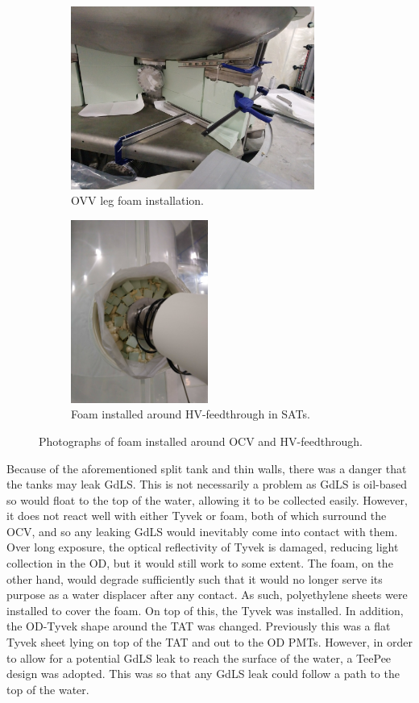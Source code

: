 \begin{figure}[!tbph]
\begin{subfigure}{.5\textwidth}
  \centering
  \includegraphics[height=6cm, width=\linewidth]{Figures/Construction/BAT_green_foam.JPG}
  \caption{OVV leg foam installation.}
  \label{fig:ocv_leg_foam}
  \end{subfigure}
  \begin{subfigure}{.5\textwidth}
  \centering
  \includegraphics[height=6cm, width=\linewidth]{Figures/Construction/HV_foam.jpg}
  \caption{Foam installed around HV-feedthrough in SATs.}
  \label{fig:hv_port_foam}
  \end{subfigure}
\caption{Photographs of foam installed around OCV and HV-feedthrough.}
\label{fig:Additional_foam_installation}
\end{figure}

\par
Because of the aforementioned split tank and thin walls, there was a danger that the tanks may leak GdLS.
This is not necessarily a problem as GdLS is oil-based so would float to the top of the water, allowing it to be collected easily.
However, it does not react well with either Tyvek or foam, both of which surround the OCV, and so any leaking GdLS would inevitably come into contact with them.
Over long exposure, the optical reflectivity of Tyvek is damaged, reducing light collection in the OD, but it would still work to some extent.
The foam, on the other hand, would degrade sufficiently such that it would no longer serve its purpose as a water displacer after any contact.
As such, polyethylene sheets were installed to cover the foam.
On top of this, the Tyvek was installed.
In addition, the OD-Tyvek shape around the TAT was changed.
Previously this was a flat Tyvek sheet lying on top of the TAT and out to the OD PMTs.
However, in order to allow for a potential GdLS leak to reach the surface of the water, a TeePee design was adopted.
This was so that any GdLS leak could follow a path to the top of the water.

